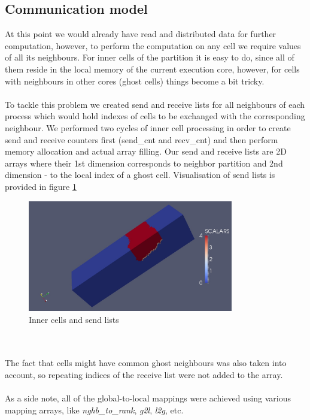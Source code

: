 \documentclass{article}
\begin{document}
\subsection{Communication model}
At this point we would already have read and distributed data for further computation, however, to perform the computation on any cell we require values of all its neighbours. For inner cells of the partition it is easy to do, since all of them reside in the local memory of the current execution core, however, for cells with neighbours in other cores (ghost cells) things become a bit tricky.
\\\\
To tackle this problem we created send and receive lists for all neighbours of each process which would hold indexes of cells to be exchanged with the corresponding neighbour. We performed two cycles of inner cell processing in order to create send and receive counters first (send\_cnt and recv\_cnt) and then perform memory allocation and actual array filling. Our send and receive lists are 2D arrays where their 1st dimension corresponds to neighbor partition and 2nd dimension - to the local index of a ghost cell. Visualisation of send lists is provided in figure \ref{fig:6}
\begin{figure}[h!]
	\begin{center}
		\includegraphics[width=0.8\textwidth]{send-listst.jpg}
		\caption{Inner cells and send lists}
		\label{fig:6}
	\end{center}
\end{figure}
\\\\
The fact that cells might have common ghost neighbours was also taken into account, so repeating indices of the receive list were not added to the array.
\\\\
As a side note, all of the global-to-local mappings were achieved using various mapping arrays, like \textit{nghb\_to\_rank}, \textit{g2l}, \textit{l2g}, etc.
\end{document}
